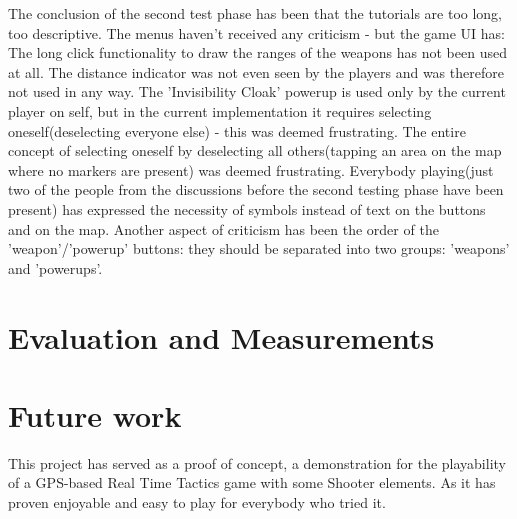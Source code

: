 \documentclass{article}
\begin{document}
The conclusion of the second test phase has been that the tutorials are too
long, too descriptive. The menus haven't received any criticism - but the game
UI has: The long click functionality to draw the ranges of the weapons has not
been used at all. The distance indicator was not even seen by the players and
was therefore not used in any way. The 'Invisibility Cloak' powerup is used only
by the current player on self, but in the current implementation it requires
selecting oneself(deselecting everyone else) - this was deemed frustrating. The
entire concept of selecting oneself by deselecting all others(tapping an area
on the map where no markers are present) was deemed frustrating. Everybody
playing(just two of the people from the discussions before the second testing
phase have been present) has expressed the necessity of symbols instead of text
on the buttons and on the map. Another aspect of criticism has been the order of
the 'weapon'/'powerup' buttons: they should be separated into two groups:
'weapons' and 'powerups'.\newline



\section{Evaluation and Measurements}



\section{Future work}


This project has served as a proof of concept, a demonstration for the
playability of a GPS-based Real Time Tactics game with some Shooter elements. As
it has proven enjoyable and easy to play for everybody who tried it.\newline
\end{document}
